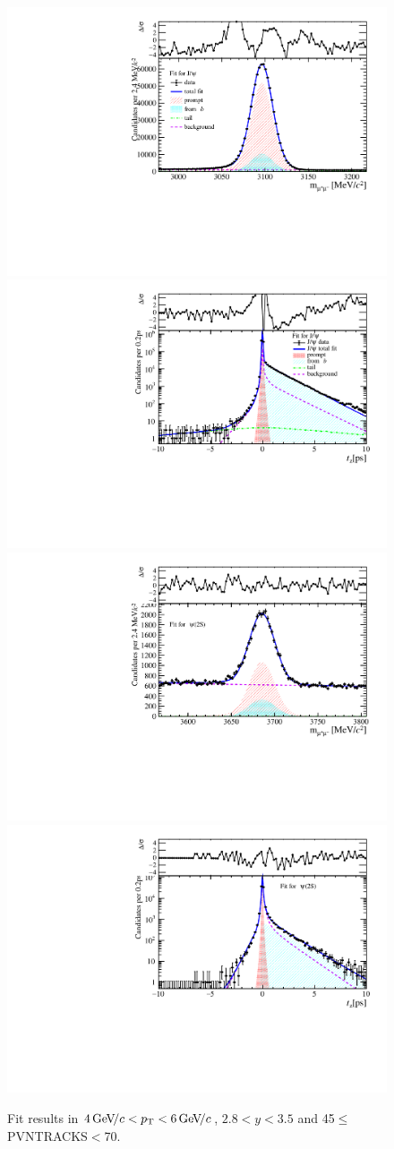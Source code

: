 \begin{figure}[H]
\begin{center}
\includegraphics[width=0.47\linewidth]{pdf/Jpsi/drawmass/n3y2pt3.pdf}
\includegraphics[width=0.47\linewidth]{pdf/Jpsi/2DFit/n3y2pt3.pdf}
\vspace*{-0.5cm}
\includegraphics[width=0.47\linewidth]{pdf/Psi2S/drawmass/n3y2pt3.pdf}
\includegraphics[width=0.47\linewidth]{pdf/Psi2S/2DFit/n3y2pt3.pdf}
\vspace*{-0.5cm}
\end{center}
\caption{Fit results in $4\text{\,Ge\kern -0.1em V\!/}c<p_{\mathrm{T}}<6\text{\,Ge\kern -0.1em V\!/}c$, $2.8<y<3.5$ and 45$\leq$PVNTRACKS$<$70.}
\label{Fitn3y2pt3}
\end{figure}
